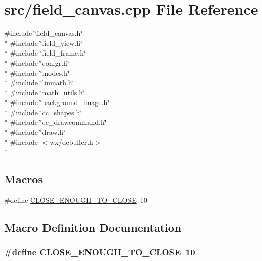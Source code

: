 \hypertarget{a00224}{\section{src/field\-\_\-canvas.cpp File Reference}
\label{a00224}
}
{\ttfamily \#include \char`\"{}field\-\_\-canvas.\-h\char`\"{}}\\*
{\ttfamily \#include \char`\"{}field\-\_\-view.\-h\char`\"{}}\\*
{\ttfamily \#include \char`\"{}field\-\_\-frame.\-h\char`\"{}}\\*
{\ttfamily \#include \char`\"{}confgr.\-h\char`\"{}}\\*
{\ttfamily \#include \char`\"{}modes.\-h\char`\"{}}\\*
{\ttfamily \#include \char`\"{}linmath.\-h\char`\"{}}\\*
{\ttfamily \#include \char`\"{}math\-\_\-utils.\-h\char`\"{}}\\*
{\ttfamily \#include \char`\"{}background\-\_\-image.\-h\char`\"{}}\\*
{\ttfamily \#include \char`\"{}cc\-\_\-shapes.\-h\char`\"{}}\\*
{\ttfamily \#include \char`\"{}cc\-\_\-drawcommand.\-h\char`\"{}}\\*
{\ttfamily \#include \char`\"{}draw.\-h\char`\"{}}\\*
{\ttfamily \#include $<$wx/dcbuffer.\-h$>$}\\*
\subsection*{Macros}
\begin{DoxyCompactItemize}
\item 
\#define \hyperlink{a00224_a1b61aa7d66b474d12bed2b48b36fc7a2}{C\-L\-O\-S\-E\-\_\-\-E\-N\-O\-U\-G\-H\-\_\-\-T\-O\-\_\-\-C\-L\-O\-S\-E}~10
\end{DoxyCompactItemize}


\subsection{Macro Definition Documentation}
\hypertarget{a00224_a1b61aa7d66b474d12bed2b48b36fc7a2}{
\subsubsection[{C\-L\-O\-S\-E\-\_\-\-E\-N\-O\-U\-G\-H\-\_\-\-T\-O\-\_\-\-C\-L\-O\-S\-E}]{\setlength{\rightskip}{0pt plus 5cm}\#define C\-L\-O\-S\-E\-\_\-\-E\-N\-O\-U\-G\-H\-\_\-\-T\-O\-\_\-\-C\-L\-O\-S\-E~10}}\label{a00224_a1b61aa7d66b474d12bed2b48b36fc7a2}
